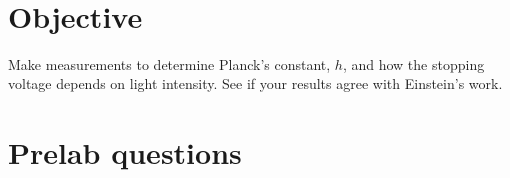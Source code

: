 \documentclass{tufte-handout}
\begin{document}



\vspace{0.5cm}
\\
\vspace{0.5cm}

\section{Objective}

Make measurements to determine Planck’s constant, $h$, and how the stopping voltage
depends on light intensity. See if your results agree with Einstein’s work.


\section{Prelab questions}
\end{document}
